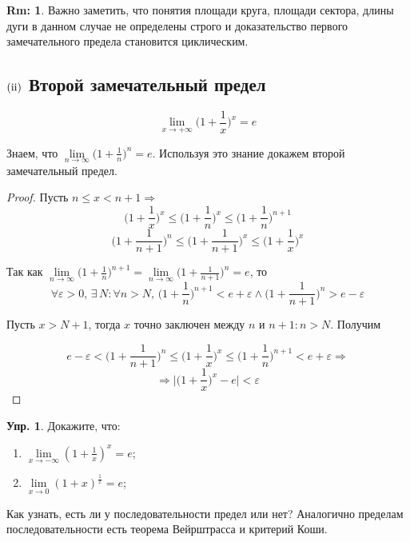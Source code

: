 \documentclass[12pt]{article}
\newcommand{\RN}[1]{%
	\textup{\uppercase\expandafter{\romannumeral#1}}%
}
\theoremstyle{definition}
\newtheorem{rem}{Rm:}
\newtheorem{exrc}{Упр.}
\begin{document}
\begin{rem}
	Важно заметить, что понятия площади круга, площади сектора, длины дуги в данном случае не определены строго и доказательство первого замечательного предела становится циклическим.
\end{rem}

\subsection*{$(\RN{2})$ Второй замечательный предел} 

$$\lim\limits_{x \to +\infty} \bigg(1 + \dfrac{1}{x}\bigg)^x = e$$

Знаем, что $\lim\limits_{n \to \infty}\big(1 + \frac{1}{n}\big)^n = e$. Используя это знание докажем второй замечательный предел.

\begin{proof}
	Пусть $n \leq x < n+1 \Rightarrow$ 
	$$\bigg(1 + \frac{1}{x}\bigg)^x \leq \bigg(1 + \frac{1}{n}\bigg)^x \leq \bigg(1 + \frac{1}{n}\bigg)^{n+1}$$
	$$\bigg(1 + \frac{1}{n+1}\bigg)^n \leq \bigg(1 + \frac{1}{n+1}\bigg)^x \leq \bigg(1 + \frac{1}{x}\bigg)^x$$
	
	Так как $\lim\limits_{n \to \infty}\big(1 + \frac{1}{n}\big)^{n+1} = \lim\limits_{n \to \infty}\big(1 + \frac{1}{n+1}\big)^n =e$, то 
	$$\forall \varepsilon >0, \, \exists \, N \colon \forall n > N, \, \bigg(1 + \frac{1}{n}\bigg)^{n+1} < e + \varepsilon \wedge \bigg(1 + \frac{1}{n+1}\bigg)^n > e - \varepsilon$$
	
	Пусть $x > N + 1$, тогда $x$ точно заключен между $n$ и $n+1 \colon n > N$. Получим
	
	$$e - \varepsilon < \bigg(1 + \frac{1}{n+1}\bigg)^n \leq \bigg(1 + \frac{1}{x}\bigg)^x \leq \bigg(1 + \frac{1}{n}\bigg)^{n+1} <  e + \varepsilon \Rightarrow$$
	$$\Rightarrow \bigg|\bigg(1 + \frac{1}{x}\bigg)^x - e\bigg| < \varepsilon$$
	
\end{proof}

\begin{exrc}Докажите, что:
	\begin{enumerate}[label={(\arabic*)}]
		\item $\lim\limits_{x \to -\infty}{(1 + \frac{1}{x})^x} = e$;
		\item $\lim\limits_{x \to 0}{(1 + x)^\frac{1}{x}} = e$;
	\end{enumerate}
\end{exrc}

Как узнать, есть ли у последовательности предел или нет? Аналогично пределам последовательности есть теорема Вейрштрасса и критерий Коши.
\end{document}
